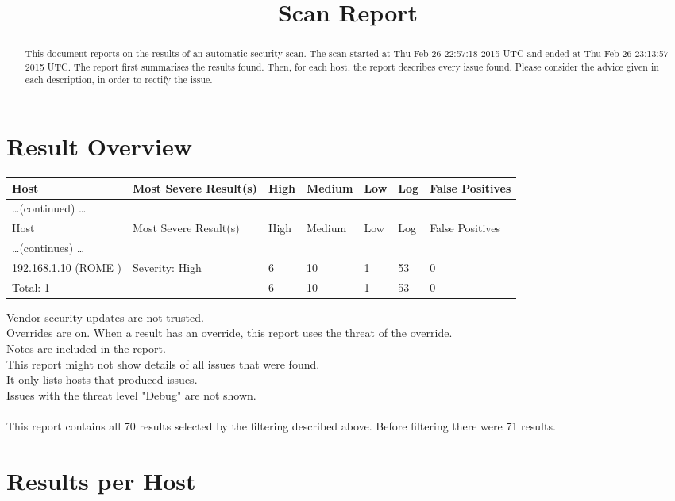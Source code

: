\documentclass{article}
\title{Scan Report}\\
\begin{document}
\maketitle

\renewcommand{\abstractname}{Summary}
\begin{abstract}
This document reports on the results of an automatic security scan.
The scan started at Thu Feb 26 22:57:18 2015 UTC and ended at Thu Feb 26 23:13:57 2015 UTC.  The
report first summarises the results found.  Then, for each host,
the report describes every issue found.  Please consider the
advice given in each description, in order to rectify the issue.
\end{abstract}
\tableofcontents
\newpage
\section{Result Overview}

\begin{longtable}{|l|l|l|l|l|l|l|}
\hline
\rowcolor{openvas_report}Host&Most Severe Result(s)&High&Medium&Low&Log&False Positives\\
\hline
\endfirsthead
\multicolumn{6}{l}{\hfill\ldots (continued) \ldots}\\
\hline
\rowcolor{openvas_report}Host&Most Severe Result(s)&High&Medium&Low&Log&False Positives\\
\hline
\endhead
\hline
\multicolumn{6}{l}{\ldots (continues) \ldots}\\
\endfoot
\hline
\endlastfoot
\hline
\hyperref[host:192.168.1.10]{192.168.1.10 (ROME           )}&Severity: High&6&10&1&53&0\\
\hline
\hline
Total: 1&&6&10&1&53&0\\
\hline
\end{longtable}
Vendor security updates are not trusted.\\
Overrides are on.  When a result has an override, this report uses the threat of the override.\\
Notes are included in the report.\\
This report might not show details of all issues that were found.\\
It only lists hosts that produced issues.\\
Issues with the threat level "Debug" are not shown.\\
\\
This report contains all 70 results selected by the filtering described above.  Before filtering there were 71 results.\section{Results per Host}
\end{document}
